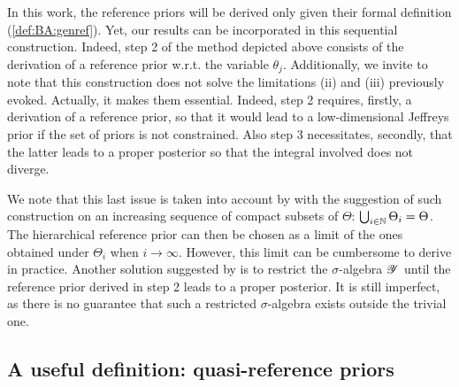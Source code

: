 In this work, the reference priors will be derived only given their formal definition (\cref{def:BA:genref}). Yet, our results can be incorporated in this sequential construction. Indeed,
step 2 of the method depicted above consists of the derivation of a reference prior w.r.t. the variable $\theta_j$.
Additionally, we invite to note that this construction does not solve the limitations (ii) and (iii) previously evoked. Actually, it makes them essential. Indeed, step 2 requires, firstly, a derivation of a reference prior, so that it would lead to a low-dimensional Jeffreys prior if the set of priors is not constrained. Also step 3 necessitates, secondly, that the latter leads to a proper posterior so that the integral involved does not diverge.

We note that this last issue is taken into account by \citet{berger_development_1992} with the suggestion of such construction on an increasing sequence of compact subsets of $\Theta$: $\bigcup_{i\in\mathbb{N}}\Theta_i=\Theta$. The hierarchical reference prior can then be chosen as a limit of the ones obtained under $\Theta_i$ when $i\to\infty$. However, this limit can be cumbersome to derive in practice. Another solution suggested by \citet{mure_objective_2018} is to restrict the $\sigma$-algebra $\mathscr{Y}$ until the reference prior derived in step 2 leads to a proper posterior. It is still imperfect, as there is no guarantee that such a restricted $\sigma$-algebra exists outside the trivial one.














\subsection{A useful definition: quasi-reference priors}\label{sec:BA:defsquas}

